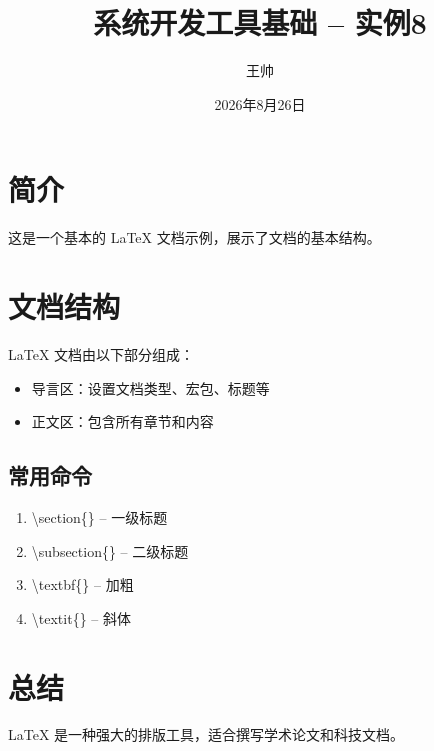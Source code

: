 \documentclass[12pt,a4paper]{article}
\title{系统开发工具基础 -- 实例8}
\author{王帅}
\date{2026年8月26日}
\begin{document}
\maketitle

\section{简介}
这是一个基本的 LaTeX 文档示例，展示了文档的基本结构。

\section{文档结构}
LaTeX 文档由以下部分组成：
\begin{itemize}
    \item 导言区：设置文档类型、宏包、标题等
    \item 正文区：包含所有章节和内容
\end{itemize}

\subsection{常用命令}
\begin{enumerate}
    \item \textbackslash section\{\} -- 一级标题
    \item \textbackslash subsection\{\} -- 二级标题
    \item \textbackslash textbf\{\} -- 加粗
    \item \textbackslash textit\{\} -- 斜体
\end{enumerate}

\section{总结}
LaTeX 是一种强大的排版工具，适合撰写学术论文和科技文档。
\end{document}
